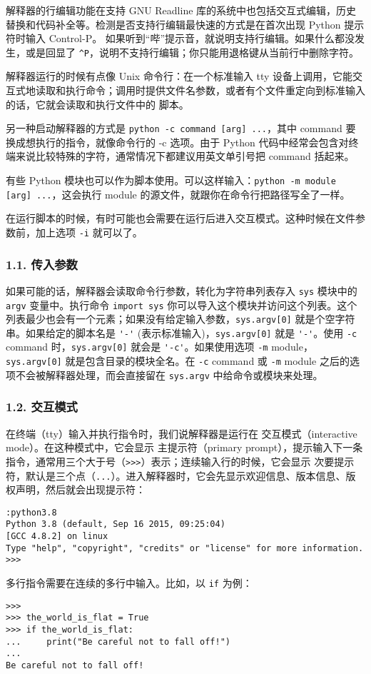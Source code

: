 解释器的行编辑功能在支持 GNU Readline 库的系统中也包括交互式编辑，历史替换和代码补全等。检测是否支持行编辑最快速的方式是在首次出现 Python 提示符时输入 Control-P。 如果听到“哔”提示音，就说明支持行编辑。如果什么都没发生，或是回显了 \verb`^P`，说明不支持行编辑；你只能用退格键从当前行中删除字符。

解释器运行的时候有点像 Unix 命令行：在一个标准输入 tty 设备上调用，它能交互式地读取和执行命令；调用时提供文件名参数，或者有个文件重定向到标准输入的话，它就会读取和执行文件中的 脚本。

另一种启动解释器的方式是 \verb`python -c command [arg] ...`，其中 command 要换成想执行的指令，就像命令行的 -c 选项。由于 Python 代码中经常会包含对终端来说比较特殊的字符，通常情况下都建议用英文单引号把 command 括起来。

有些 Python 模块也可以作为脚本使用。可以这样输入：\verb`python -m module [arg] ...`，这会执行 module 的源文件，就跟你在命令行把路径写全了一样。

在运行脚本的时候，有时可能也会需要在运行后进入交互模式。这种时候在文件参数前，加上选项 \verb`-i` 就可以了。

\subsubsection{1.1. 传入参数}
如果可能的话，解释器会读取命令行参数，转化为字符串列表存入 \verb`sys` 模块中的 \verb`argv` 变量中。执行命令 \verb`import sys` 你可以导入这个模块并访问这个列表。这个列表最少也会有一个元素；如果没有给定输入参数，\verb`sys.argv[0]` 就是个空字符串。如果给定的脚本名是 \verb`'-'` (表示标准输入)，\verb`sys.argv[0]` 就是 \verb`'-'`。使用 \verb`-c` command 时，\verb`sys.argv[0]` 就会是 \verb`'-c'`。如果使用选项 \verb`-m` module，\verb`sys.argv[0]` 就是包含目录的模块全名。在 \verb`-c` command 或 \verb`-m` module 之后的选项不会被解释器处理，而会直接留在 \verb`sys.argv` 中给命令或模块来处理。

\subsubsection{1.2. 交互模式}

在终端（tty）输入并执行指令时，我们说解释器是运行在 交互模式（interactive mode）。在这种模式中，它会显示 主提示符（primary prompt），提示输入下一条指令，通常用三个大于号（\verb`>>>`）表示；连续输入行的时候，它会显示 次要提示符，默认是三个点（\verb`...`）。进入解释器时，它会先显示欢迎信息、版本信息、版权声明，然后就会出现提示符：

\begin{lstlisting}[language=none]
:python3.8
Python 3.8 (default, Sep 16 2015, 09:25:04)
[GCC 4.8.2] on linux
Type "help", "copyright", "credits" or "license" for more information.
>>>
\end{lstlisting}
多行指令需要在连续的多行中输入。比如，以 \verb`if` 为例：
\begin{lstlisting}[language=none]
>>>
>>> the_world_is_flat = True
>>> if the_world_is_flat:
...     print("Be careful not to fall off!")
...
Be careful not to fall off!
\end{lstlisting}

